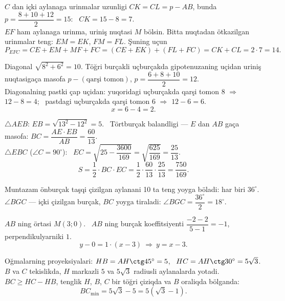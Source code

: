 $C$ dan içki aylanaga urinmalar uzunligi $CK=CL=p-AB$, bunda $p=\dfrac{8+10+12}2=15$: \ $CK=15-8=7$.\\
$EF$ ham aylanaga urinma, uriniş nuqtasi $M$ bölsin. Bitta nuqtadan ötkazilgan urinmalar teng: $EM=EK$, $FM=FL$. Şuning uçun
\[P_{EFC}=CE+EM+MF+FC=(CE+EK)+(FL+FC)=CK+CL=2\cdot7=14.\]

Diagonal $\sqrt{8^2+6^2}=10$. Töğri burçakli uçburçakda gipotenuzaning uçidan uriniş nuqtasigaça masofa $p-(\text{qarşi tomon})$, $p=\dfrac{6+8+10}2=12$.\\
Diagonalning pastki çap uçidan: yuqoridagi uçburçakda qarşi tomon $8$ $\Rightarrow$ $12-8=4$; \ pastdagi uçburçakda qarşi tomon $6$ $\Rightarrow$ $12-6=6$.
\[x=6-4=2.\]

$\triangle AEB$: $EB=\sqrt{13^2-12^2}=5$. \ Törtburçak balandligi — $E$ dan $AB$ gaça masofa: $BC=\dfrac{AE\cdot EB}{AB}=\dfrac{60}{13}$.\\
$\triangle EBC$ ($\angle C=90^\circ$): \ $EC=\sqrt{25-\dfrac{3600}{169}}=\sqrt{\dfrac{625}{169}}=\dfrac{25}{13}$.
\[S=\frac12\cdot BC\cdot EC=\frac12\cdot\frac{60}{13}\cdot\frac{25}{13}=\frac{750}{169}.\]

Muntazam önburçak taşqi çizilgan aylanani 10 ta teng yoyga böladi: har biri $36^\circ$.\\
$\angle BGC$ — içki çizilgan burçak, $BC$ yoyga tiraladi: $\angle BGC=\dfrac{36^\circ}2=18^\circ$.

$AB$ ning örtasi $M(3;0)$. \ $AB$ ning burçak koeffitsiyenti $\dfrac{-2-2}{5-1}=-1$, perpendikulyarniki $1$.
\[y-0=1\cdot(x-3)\ \Rightarrow\ y=x-3.\]

Oğmalarning proyeksiyalari: $HB=AH\ctg45^\circ=5$, \ $HC=AH\ctg30^\circ=5\sqrt3$.\\
$B$ va $C$ tekislikda, $H$ markazli $5$ va $5\sqrt3$ radiusli aylanalarda yotadi. $BC\ge HC-HB$, tenglik $H$, $B$, $C$ bir töğri çiziqda va $B$ oraliqda bölganda:
\[BC_{\min}=5\sqrt3-5=5(\sqrt3-1).\]

